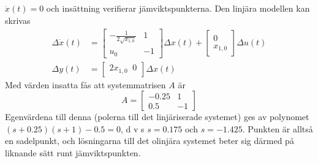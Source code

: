 \subsection{}
$\dot{x}(t)=0$ och insättning verifierar jämviktspunkterna.
Den linjära modellen kan skrivas
\begin{align*} 
\Delta \dot{x}(t)&=\begin{bmatrix} -\frac{1}{2 \sqrt{x_{1,0}}}& 1\\u_0&-1\end{bmatrix}
\Delta x(t)+\begin{bmatrix} 0 \\x_{1,0}\end{bmatrix} \Delta u(t)\\
\Delta y(t)&=\begin{bmatrix} 2 x_{1,0}\;\; 0\end{bmatrix} \Delta x(t)
\end{align*}
Med värden insatta fås att systemmatrisen $A$ är
\begin{equation*}
A=\begin{bmatrix} -0.25 &1\\0.5&-1\end{bmatrix}
\end{equation*}
Egenvärdena till denna (polerna till det linjäriserade systemet) ges
av polynomet $(s+0.25)(s+1)-0.5=0$,  d v s
$s=0.175$ och $s=-1.425$. Punkten är alltså en sadelpunkt, och 
lösningarna till det olinjära systemet beter sig därmed på liknande
sätt runt jämviktspunkten. 

 
